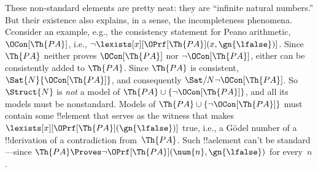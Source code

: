 \documentclass[../../../include/open-logic-section]{subfiles}
\begin{document}
These non-standard elements are pretty neat: they are ``infinite
natural numbers.'' But their existence also explains, in a sense, the
incompleteness phenomena.  Cconsider an example, e.g., the consistency
statement for Peano arithmetic, $\OCon[\Th{PA}]$, i.e., $\lnot
\lexists[x][\OPrf[\Th{PA}](x, \gn{\lfalse})]$. Since $\Th{PA}$ neither
proves $\OCon[\Th{PA}]$ nor $\lnot \OCon[\Th{PA}]$, either can be
consistently added to $\Th{PA}$. Since $\Th{PA}$ is consistent,
$\Sat{N}{\OCon[\Th{PA}]}$, and consequently $\Sat/{N}{\lnot
  \OCon[\Th{PA}]}$.  So $\Struct{N}$ is \emph{not} a model of $\Th{PA}
\cup \{\lnot \OCon[\Th{PA}]\}$, and all its models must be
nonstandard. Models of $\Th{PA} \cup \{\lnot \OCon[\Th{PA}]\}$ must
contain some !!{element} that serves as the witness that makes
$\lexists[x][\OPrf[\Th{PA}](\gn{\lfalse})]$ true, i.e., a G\"odel
number of a !!{derivation} of a contradiction from~$\Th{PA}$.  Such
!!a{element} can't be standard---since $\Th{PA} \Proves \lnot
\OPrf[\Th{PA}](\num{n}, \gn{\lfalse})$ for every~$n$.
\end{document}
